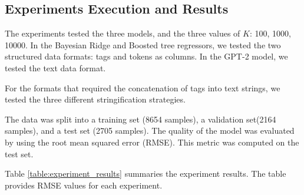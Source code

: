\documentclass[sn-mathphys]{sn-jnl}%
\theoremstyle{thmstyleone}%
\theoremstyle{thmstyletwo}%
\theoremstyle{thmstylethree}%
\begin{document}
\subsection{Experiments Execution and Results}

The experiments tested the three models, and the three values of $K$: \num{100}, \num{1000}, \num{10000}.
In the Bayesian Ridge and Boosted tree regressors, we tested the two structured data formats: tags and tokens as columns.
In the GPT-2 model, we tested the text data format.

For the formats that required the concatenation of tags into text strings, we tested the three different stringification strategies.

The data was split into a training set (\num{8654} samples), a validation set(\num{2164} samples), and a test set (\num{2705} samples).
The quality of the model was evaluated by using the root mean squared error (RMSE).
This metric was computed on the test set.

Table \ref{table:experiment_results} summaries the experiment results.
The table provides RMSE values for each experiment.



\end{document}
